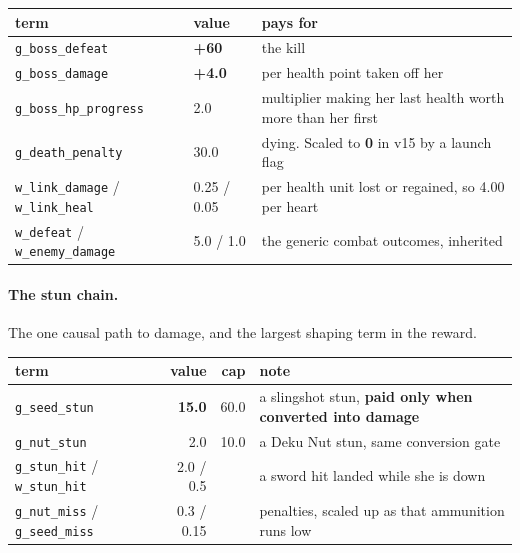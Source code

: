 \documentclass[11pt]{article}
\begin{document}
\begin{table}[!htbp]
  \centering
  \label{tab:therewardactuallyusedtotrain}
\begin{center}\small
\begin{tabularx}{\linewidth}{@{}XXX@{}}
\toprule
\textbf{term} & \textbf{value} & \textbf{pays for} \\
\midrule
\texttt{g\_boss\_defeat} & \textbf{+60} & the kill \\
\texttt{g\_boss\_damage} & \textbf{+4.0} & per health point taken off her \\
\texttt{g\_boss\_hp\_progress} & 2.0 & multiplier making her last health worth more than her first \\
\texttt{g\_death\_penalty} & 30.0 & dying. Scaled to \textbf{0} in v15 by a launch flag \\
\texttt{w\_link\_damage} / \texttt{w\_link\_heal} & 0.25 / 0.05 & per health unit lost or regained, so 4.00 per heart \\
\texttt{w\_defeat} / \texttt{w\_enemy\_damage} & 5.0 / 1.0 & the generic combat outcomes, inherited \\
\bottomrule
\end{tabularx}
\end{center}
\end{table}

\paragraph{The stun chain.} The one causal path to damage, and the largest shaping term in the reward.

\begin{table}[!htbp]
  \centering
  \label{tab:theexperimentalpresetaddedaf}
\begin{center}\small
\begin{tabularx}{\linewidth}{@{}XrrX@{}}
\toprule
\textbf{term} & \textbf{value} & \textbf{cap} & \textbf{note} \\
\midrule
\texttt{g\_seed\_stun} & \textbf{15.0} & 60.0 & a slingshot stun, \textbf{paid only when converted into damage} \\
\texttt{g\_nut\_stun} & 2.0 & 10.0 & a Deku Nut stun, same conversion gate \\
\texttt{g\_stun\_hit} / \texttt{w\_stun\_hit} & 2.0 / 0.5 &  & a sword hit landed while she is down \\
\texttt{g\_nut\_miss} / \texttt{g\_seed\_miss} & 0.3 / 0.15 &  & penalties, scaled up as that ammunition runs low \\
\bottomrule
\end{tabularx}
\end{center}
\end{table}
\end{document}
